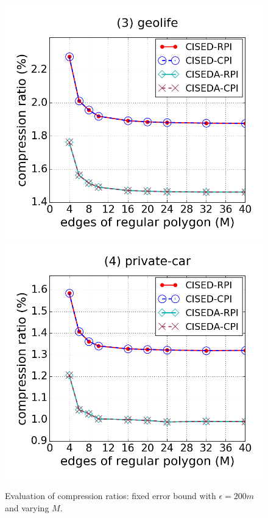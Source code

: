 \begin{figure}[tb!]
\includegraphics[scale = 0.250]{figures/Exp-M-e-200-CR-geolife.png}
\includegraphics[scale = 0.250]{figures/Exp-M-e-200-CR-private.png}
\vspace{-2ex}
\caption{\small Evaluation of compression ratios: fixed error bound with $\epsilon=200m$ and varying $M$.}
\label{fig:m-cr-e200}
\vspace{-2ex}
\end{figure}


